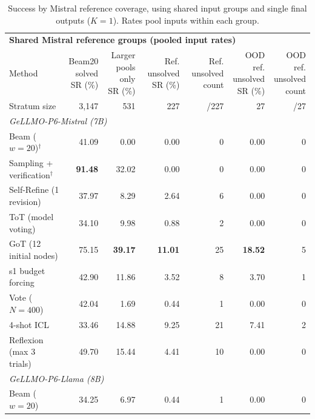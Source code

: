 \begin{table}[t]
\centering\EvalTableFont
\setlength{\tabcolsep}{3pt}\renewcommand{\arraystretch}{1.10}
\caption{Success by Mistral reference coverage, using shared input groups and single final outputs ($K=1$). Rates pool inputs within each group.}
\label{tab:difficulty}
\begin{tabular*}{\linewidth}{@{\extracolsep{\fill}}l r r r r r r@{}}
\toprule
\multicolumn{7}{l}{\textbf{Shared Mistral reference groups (pooled input rates)}} \\
Method & \shortstack{Beam20\\solved\\SR (\%)} & \shortstack{Larger pools\\only\\SR (\%)} & \shortstack{Ref. unsolved\\SR (\%)} & \shortstack{Ref. unsolved\\count} & \shortstack{OOD ref.\\unsolved\\SR (\%)} & \shortstack{OOD ref.\\unsolved\\count} \\
Stratum size & 3,147 & 531 & 227 & /227 & 27 & /27 \\
\midrule
\multicolumn{7}{l}{\textit{GeLLMO-P6-Mistral (7B)}} \\
Beam ($w=20$)$^{\dagger}$ & 41.09 & 0.00 & 0.00 & 0 & 0.00 & 0 \\
Sampling + verification$^{\dagger}$ & \textbf{91.48} & 32.02 & 0.00 & 0 & 0.00 & 0 \\
Self-Refine (1 revision) & 37.97 & 8.29 & 2.64 & 6 & 0.00 & 0 \\
ToT (model voting) & 34.10 & 9.98 & 0.88 & 2 & 0.00 & 0 \\
GoT (12 initial nodes) & 75.15 & \textbf{39.17} & \textbf{11.01} & 25 & \textbf{18.52} & 5 \\
s1 budget forcing & 42.90 & 11.86 & 3.52 & 8 & 3.70 & 1 \\
Vote ($N=400$) & 42.04 & 1.69 & 0.44 & 1 & 0.00 & 0 \\
4-shot ICL & 33.46 & 14.88 & 9.25 & 21 & 7.41 & 2 \\
Reflexion (max 3 trials) & 49.70 & 15.44 & 4.41 & 10 & 0.00 & 0 \\
\midrule
\multicolumn{7}{l}{\textit{GeLLMO-P6-Llama (8B)}} \\
Beam ($w=20$) & 34.25 & 6.97 & 0.44 & 1 & 0.00 & 0 \\

\end{tabular*}
\end{table}
